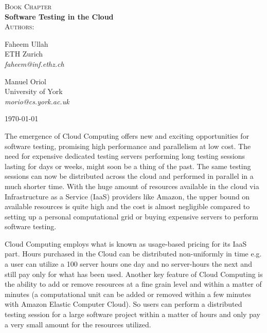\documentclass [a4paper, 11pt, twoside] {report}
\begin{document}
\begin{titlepage}
\begin{center}

\textsc{\Large Book Chapter } \\ [2cm]

{ \huge \bfseries Software Testing in the Cloud}\\[4cm]
\textsc{\large Authors:} \\[0.5cm]

\begin{minipage}{0.4\textwidth}
\begin{flushleft} \large
Faheem Ullah\\
ETH Zurich\\
\emph{faheem@inf.ethz.ch}
\end{flushleft}
\end{minipage}
\begin{minipage}{0.4\textwidth}
\begin{flushright} \large
Manuel Oriol\\
University of York\\
\emph{morio@cs.york.ac.uk}
\end{flushright}
\end{minipage}

\vfill
{\large \today}
\end{center}
\end{titlepage}
\pagebreak

The emergence of Cloud Computing offers new and exciting opportunities for software testing, promising high performance and parallelism at low cost. The need for expensive dedicated testing servers performing long testing sessions lasting for days or weeks, might soon be a thing of the past. The same testing sessions can now be distributed across the cloud and performed in parallel in a much shorter time. With the huge amount of resources available in the cloud via Infrastructure as a Service (IaaS) providers like Amazon, the upper bound on available resources is quite high and the cost is almost negligible compared to setting up a personal computational grid or buying expensive servers to perform software testing. 

Cloud Computing employs what is known as usage-based pricing for its IaaS part. Hours purchased in the Cloud can be distributed non-uniformly in time e.g. a user can utilize a 100 server hours one day and no server-hours the next and still pay only for what has been used. Another key feature of Cloud Computing is the ability to add or remove resources at a fine grain level and within a matter of minutes (a computational unit can be added or removed within a few minutes with Amazon Elastic Computer Cloud). So users can perform a distributed testing session for a large software project within a matter of hours and only pay a very small amount for the resources utilized. 
\end{document}
